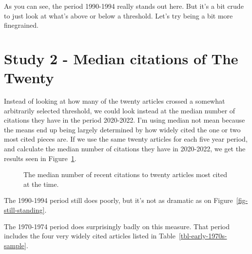 \documentclass[
  10pt,
  letterpaper,
  DIV=11,
  numbers=noendperiod,
  twoside]{scrartcl}
\begin{document}
As you can see, the period 1990-1994 really stands out here. But it's a
bit crude to just look at what's above or below a threshold. Let's try
being a bit more finegrained.

\section{Study 2 - Median citations of The Twenty}\label{sec-study-two}

Instead of looking at how many of the twenty articles crossed a somewhat
arbitrarily selected threshold, we could look instead at the median
number of citations they have in the period 2020-2022. I'm using median
not mean because the means end up being largely determined by how widely
cited the one or two most cited pieces are. If we use the same twenty
articles for each five year period, and calculate the median number of
citations they have in 2020-2022, we get the results seen in
Figure~\ref{fig-median-cites}.

\begin{figure}


\caption{\label{fig-median-cites}The median number of recent citations
to twenty articles most cited at the time.}

\end{figure}%

The 1990-1994 period still does poorly, but it's not as dramatic as on
Figure~\ref{fig-still-standing}.

The 1970-1974 period does surprisingly badly on this measure. That
period includes the four very widely cited articles listed in
Table~\ref{tbl-early-1970s-sample}.
\end{document}
